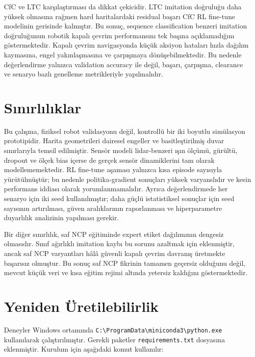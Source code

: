 \documentclass[11pt,a4paper]{article}
\begin{document}
CfC ve LTC karşılaştırması da dikkat çekicidir. LTC imitation doğruluğu daha yüksek olmasına rağmen hard haritalardaki residual başarı CfC RL fine-tune modelinin gerisinde kalmıştır. Bu sonuç, sequence classification benzeri imitation doğruluğunun robotik kapalı çevrim performansını tek başına açıklamadığını göstermektedir. Kapalı çevrim navigasyonda küçük aksiyon hataları hızla dağılım kaymasına, engel yakınlaşmasına ve çarpışmaya dönüşebilmektedir. Bu nedenle değerlendirme yalnızca validation accuracy ile değil, başarı, çarpışma, clearance ve senaryo bazlı genelleme metrikleriyle yapılmalıdır.

\section{Sınırlılıklar}

Bu çalışma, fiziksel robot validasyonu değil, kontrollü bir iki boyutlu simülasyon prototipidir. Harita geometrileri dairesel engeller ve basitleştirilmiş duvar sınırlarıyla temsil edilmiştir. Sensör modeli lidar-benzeri ışın ölçümü, gürültü, dropout ve ölçek bias içerse de gerçek sensör dinamiklerini tam olarak modellememektedir. RL fine-tune aşaması yalnızca kısa episode sayısıyla yürütülmüştür; bu nedenle politika-gradient sonuçları yüksek varyanslıdır ve kesin performans iddiası olarak yorumlanmamalıdır. Ayrıca değerlendirmede her senaryo için iki seed kullanılmıştır; daha güçlü istatistiksel sonuçlar için seed sayısının artırılması, güven aralıklarının raporlanması ve hiperparametre duyarlılık analizinin yapılması gerekir.

Bir diğer sınırlılık, saf NCP eğitiminde expert etiket dağılımının dengesiz olmasıdır. Sınıf ağırlıklı imitation kaybı bu sorunu azaltmak için eklenmiştir, ancak saf NCP varyantları hâlâ güvenli kapalı çevrim davranış üretmekte başarısız olmuştur. Bu sonuç saf NCP fikrinin tamamen geçersiz olduğunu değil, mevcut küçük veri ve kısa eğitim rejimi altında yetersiz kaldığını göstermektedir.

\section{Yeniden Üretilebilirlik}

Deneyler Windows ortamında \texttt{C:\textbackslash ProgramData\textbackslash miniconda3\textbackslash python.exe} kullanılarak çalıştırılmıştır. Gerekli paketler \texttt{requirements.txt} dosyasına eklenmiştir. Kurulum için aşağıdaki komut kullanılır:
\end{document}
